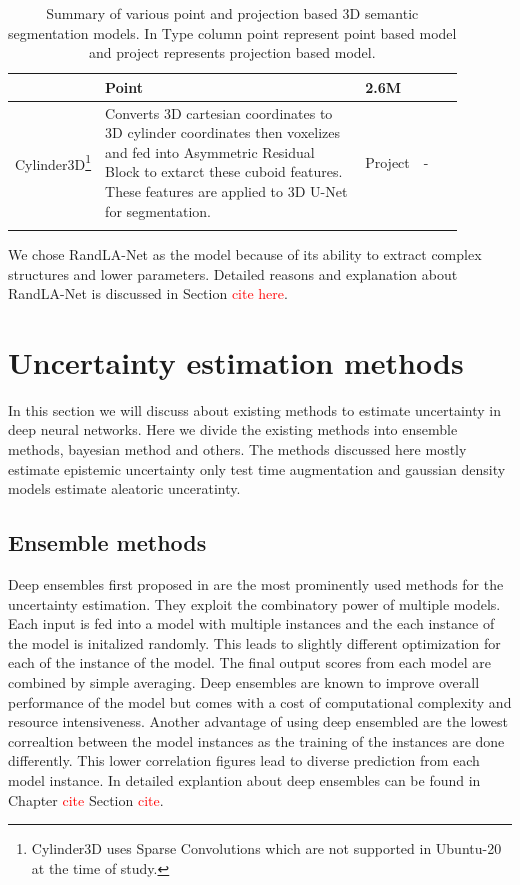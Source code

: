 \begin{longtable}{|p{0.15\linewidth} | p{0.59\linewidth}| p{0.06\linewidth} |p{0.09\linewidth}|}
        & Point & 2.6M \\
        \hline
        Cylinder3D\cite{zhu2020cylindrical}\footnote{Cylinder3D uses Sparse Convolutions which are not supported in Ubuntu-20 at the time of study.} &
        Converts 3D cartesian coordinates to 3D cylinder coordinates then voxelizes and fed into Asymmetric Residual Block to extarct these cuboid features.
        These features are applied to 3D U-Net for segmentation.
        & Project & - \\
        \hline
        \caption{Summary of various point and projection based 3D semantic segmentation models. In Type column point represent point based model and project represents projection based model.}
        \label{tab:model_relatedwork}
\end{longtable}

    We chose RandLA-Net as the model because of its ability to extract complex structures and lower parameters.
    Detailed reasons and explanation about RandLA-Net is discussed in Section \textcolor{red}{cite here}.

    \section{Uncertainty estimation methods}
    In this section we will discuss about existing methods to estimate uncertainty in deep neural networks.
    Here we divide the existing methods into ensemble methods, bayesian method and others.
    The methods discussed here mostly estimate epistemic uncertainty only test time augmentation and gaussian density models estimate aleatoric unceratinty.
    \subsection{Ensemble methods}
    Deep ensembles first proposed in  \cite{lakshminarayanan2016simple} are the most prominently used methods for the uncertainty estimation.
    They exploit the combinatory power of multiple models. Each input is fed into a model with multiple instances and the each instance of the model is initalized randomly.
    This leads to slightly different optimization for each of the instance of the model. The final output scores from each model are combined by simple averaging.
    Deep ensembles are known to improve overall performance of the model but comes with a cost of computational complexity and resource intensiveness.
    Another advantage of using deep ensembled are the lowest correaltion between the model instances as the training of the instances are done differently.
    This lower correlation figures lead to diverse prediction from each model instance.
    In detailed explantion about deep ensembles can be found in Chapter \textcolor{red}{cite} Section \textcolor{red}{cite}.

